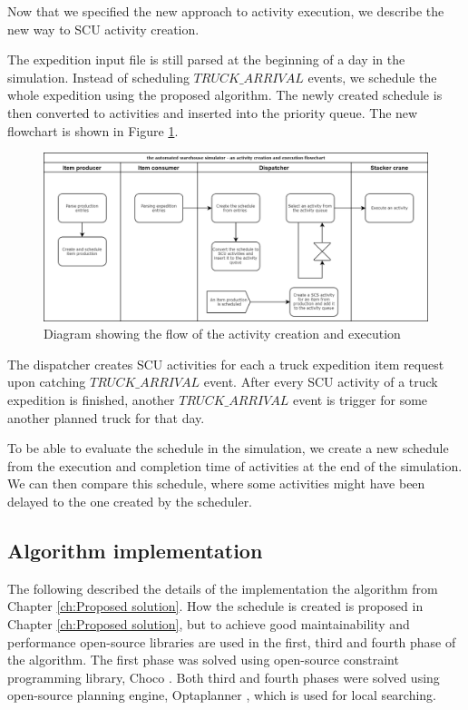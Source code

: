 \documentclass{ctuthesis}
\begin{document}
Now that we specified the new approach to activity execution, we describe the new way to SCU activity creation. 

The expedition input file is still parsed at the beginning of a day in the simulation. Instead of scheduling $TRUCK\_ARRIVAL$ events, we schedule the whole expedition using the proposed algorithm. The newly created schedule is then converted to activities and inserted into the priority queue. The new flowchart is shown in Figure \ref{flowchartNew}. 

\begin{figure}[H]
\includegraphics[width=1\linewidth]{flowchartNew.png}
\caption{Diagram showing the flow of the activity creation and execution}
\label{flowchartNew}
\end{figure}

The dispatcher creates SCU activities for each a truck expedition item request upon catching $TRUCK\_ARRIVAL$ event. After every SCU activity of a truck expedition is finished, another $TRUCK\_ARRIVAL$ event is trigger for some another planned truck for that day.  

To be able to evaluate the schedule in the simulation, we create a new schedule from the execution and completion time of activities at the end of the simulation. We can then compare this schedule, where some activities might have been delayed to the one created by the scheduler. 

\subsection{Algorithm implementation}

The following described the details of the implementation the algorithm from Chapter \ref{ch:Proposed solution}. How the schedule is created is proposed in Chapter \ref{ch:Proposed solution}, but to achieve good maintainability and performance open-source libraries are used in the first, third and fourth phase of the algorithm. The first phase was solved using open-source constraint programming library, Choco \cite{choco}. Both third and fourth phases were solved using open-source planning engine, Optaplanner \cite{optaplanner}, which is used for local searching.
\end{document}
